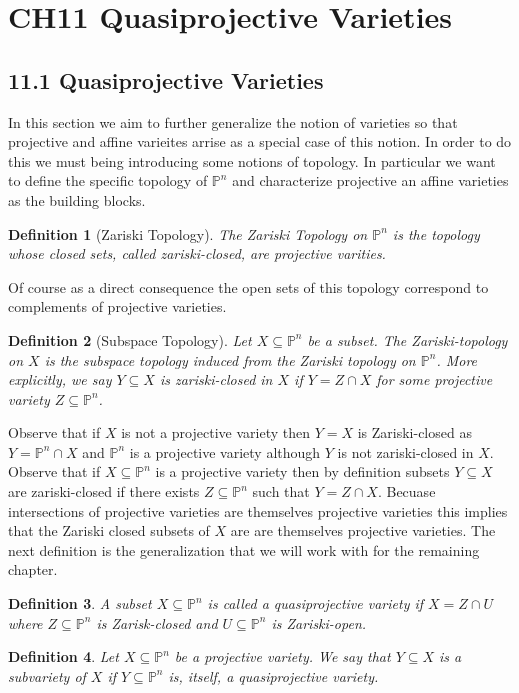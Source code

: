 \documentclass[40pt]{article}
\newtheorem{definition}{Definition}[section]
\newcommand{\Proj}{\mathbb{P}}
\theoremstyle{remark}
\begin{document}
				\section{CH11 Quasiprojective Varieties}
				\subsection{11.1 Quasiprojective Varieties}
				In this section we aim to further generalize the notion of varieties so that projective and affine varieites arrise as a special case of this notion. In order to do this we must being introducing some notions of topology. In particular we want to define the specific topology of $\Proj^n$ and characterize projective an affine varieties as the building blocks. 
				\begin{definition}[Zariski Topology]
					The Zariski Topology on $\Proj^n$ is the topology whose closed sets, called zariski-closed, are projective varities.
				\end{definition}
				Of course as a direct consequence the open sets of this topology correspond to complements of projective varieties. 
				\begin{definition}[Subspace Topology]
					Let $X \subseteq \Proj^n$ be a subset. The Zariski-topology on $X$ is the subspace topology induced from the Zariski topology on $\Proj^n$. More explicitly, we say $Y \subseteq X$ is zariski-closed in $X$ if $Y = Z \cap X$ for some projective variety $Z \subseteq \Proj^n$.
				\end{definition}
				Observe that if $X$ is not a projective variety then $Y = X$ is Zariski-closed as $Y = \Proj^n \cap X$ and $\Proj^n$ is a projective variety although $Y$ is not zariski-closed in $X$. Observe that if $X \subseteq \Proj^n$ is a projective variety then by definition subsets $Y \subseteq X$ are zariski-closed if there exists $Z \subseteq \Proj^n$ such that $Y = Z \cap X$. Becuase intersections of projective varieties are themselves projective varieties this implies that the Zariski closed subsets of $X$ are are themselves projective varieties. The next definition is the generalization that we will work with for the remaining chapter. 
				\begin{definition}
					A subset $X \subseteq \Proj^n$ is called a quasiprojective variety if $X = Z \cap U$ where $Z\subseteq\Proj^n$ is Zarisk-closed and $U\subseteq\Proj^n$ is Zariski-open.
				\end{definition}
				\begin{definition}
					Let $X \subseteq \Proj^n$ be a projective variety. We say that $Y \subseteq X$ is a subvariety of $X$ if $Y\subseteq \Proj^n$ is, itself, a quasiprojective variety.
				\end{definition}
\end{document}
